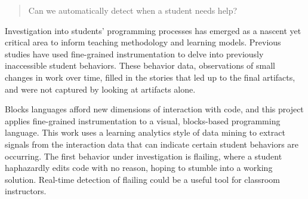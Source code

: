 % 
% 
%

\begin{quote}
Can we automatically detect when a student needs help?
\end{quote}
Investigation into students' programming processes has emerged as a nascent yet critical area to inform teaching methodology and learning models. Previous studies have used fine-grained instrumentation to delve into previously inaccessible student behaviors. These behavior data, observations of small changes in work over time, filled in the stories that led up to the final artifacts, and were not captured by looking at artifacts alone. 

Blocks languages afford new dimensions of interaction with code, and this project applies fine-grained instrumentation to a visual, blocks-based programming language. This work uses a learning analytics style of data mining to extract signals from the interaction data that can indicate certain student behaviors are occurring. The first behavior under investigation is flailing, where a student haphazardly edits code with no reason, hoping to stumble into a working solution. Real-time detection of flailing could be a useful tool for classroom instructors.
